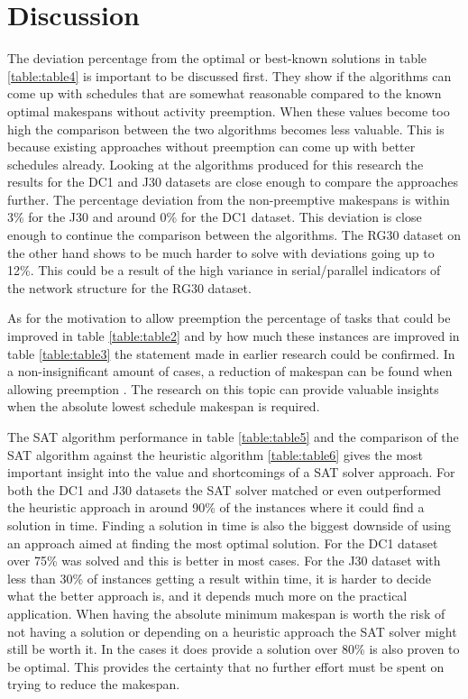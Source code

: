 \section{Discussion} \label{section:discussion}
The deviation percentage from the optimal or best-known solutions in table \ref{table:table4} is important to be discussed first. They show if the algorithms can come up with schedules that are somewhat reasonable compared to the known optimal makespans without activity preemption. When these values become too high the comparison between the two algorithms becomes less valuable. This is because existing approaches without preemption can come up with better schedules already.
Looking at the algorithms produced for this research the results for the DC1 and J30 datasets are close enough to compare the approaches further. The percentage deviation from the non-preemptive makespans is within 3\% for the J30 and around 0\% for the DC1 dataset. This deviation is close enough to continue the comparison between the algorithms. The RG30 dataset on the other hand shows to be much harder to solve with deviations going up to 12\%. This could be a result of the high variance in serial/parallel indicators of the network structure for the RG30 dataset.

As for the motivation to allow preemption the percentage of tasks that could be improved in table \ref{table:table2} and by how much these instances are improved in table \ref{table:table3} the statement made in earlier research could be confirmed. In a non-insignificant amount of cases, a reduction of makespan can be found when allowing preemption \cite{RN1}. The research on this topic can provide valuable insights when the absolute lowest schedule makespan is required.

The SAT algorithm performance in table \ref{table:table5} and the comparison of the SAT algorithm against the heuristic algorithm \ref{table:table6} gives the most important insight into the value and shortcomings of a SAT solver approach. For both the DC1 and J30 datasets the SAT solver matched or even outperformed the heuristic approach in around 90\% of the instances where it could find a solution in time. Finding a solution in time is also the biggest downside of using an approach aimed at finding the most optimal solution. For the DC1 dataset over 75\% was solved and this is better in most cases. For the J30 dataset with less than 30\% of instances getting a result within time, it is harder to decide what the better approach is, and it depends much more on the practical application. When having the absolute minimum makespan is worth the risk of not having a solution or depending on a heuristic approach the SAT solver might still be worth it. In the cases it does provide a solution over 80\% is also proven to be optimal. This provides the certainty that no further effort must be spent on trying to reduce the makespan.

